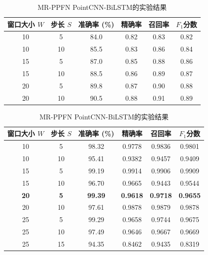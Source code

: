 \begin{table}[htbp]
    \begin{subtable}{\linewidth}
        \centering
        \caption{MR-PPFN PointNet++-BiLSTM的实验结果}
        \begin{tabular}{cc|cccc}
            \toprule
            窗口大小 $W$ & 步长 $S$ & 准确率 (\%) & 精确率 & 召回率 & $F_1$分数 \\
            \midrule
            10 & 5 & 84.0 & 0.82 & 0.83 & 0.82 \\
            10 & 10 & 85.5 & 0.83 & 0.86 & 0.84 \\
            15 & 5 & 87.0 & 0.85 & 0.88 & 0.86 \\
            15 & 10 & 88.5 & 0.86 & 0.89 & 0.87 \\
            20 & 5 & 89.8 & 0.87 & 0.90 & 0.88 \\
            20 & 10 & 90.5 & 0.88 & 0.91 & 0.89 \\
            \bottomrule
        \end{tabular}
        \label{tab:MR-PPFN PointNet++-BiLSTM_window_step_performance}
    \end{subtable}
    \begin{subtable}{\linewidth}
        \centering
        \caption{MR-PPFN PointCNN-BiLSTM的实验结果}
        \begin{tabular}{cc|cccc}
            \toprule
            窗口大小 $W$ & 步长 $S$ & 准确率 (\%) & 精确率 & 召回率 & $F_1$分数 \\
            \midrule
            10 & 5 & 98.32 & 0.9778 & 0.9836 & 0.9801 \\
            10 & 10 & 95.41 & 0.9382 & 0.9457 & 0.9409 \\
            15 & 5 & 99.19 & 0.9914 & 0.9906 & 0.9909 \\
            15 & 10 & 96.70 & 0.9665 & 0.9443 & 0.9544 \\
            \textbf{20} & \textbf{5} & \textbf{99.39} & \textbf{0.9618} & \textbf{0.9718} & \textbf{0.9655} \\
            20 & 10 & 97.61 & 0.9878 & 0.9879 & 0.9878 \\
            25 & 5 & 99.29 & 0.9658 & 0.9744 & 0.9675 \\
            25 & 10 & 97.49 & 0.9646 & 0.9667 & 0.9669 \\
            25 & 15 & 94.35 & 0.8462 & 0.9435 & 0.8319 \\
            \bottomrule
        \end{tabular}
        \label{tab:MR-PPFN PointCNN-BiLSTM_window_step_performance}
    \end{subtable}
\end{table} 

